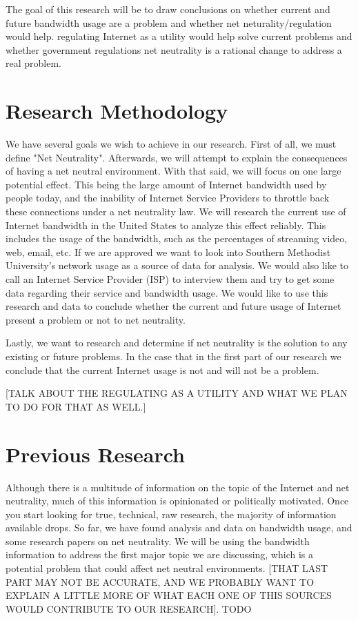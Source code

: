 \documentclass{sigcomm-alternate}
\begin{document}
The goal of this research will be to draw conclusions on whether current and future bandwidth usage are a problem and whether net neturality/regulation would help. regulating Internet as a utility would help solve current problems and whether government regulations net neutrality is a rational change to address a real problem.


     		
\section{Research Methodology}
We have several goals we wish to achieve in our research. First of all, we must define "Net Neutrality". Afterwards, we will attempt to explain the consequences of having a net neutral environment. With that said, we will focus on one large potential effect. This being the large amount of Internet bandwidth used by people today, and the inability of Internet Service Providers to throttle back these connections under a net neutrality law. We will research the current use of Internet bandwidth in the United States to analyze this effect reliably. This includes the usage of the bandwidth, such as the percentages of streaming video, web, email, etc. If we are approved we want to look into Southern Methodist University's network usage as a source of data for analysis. We would also like to call an Internet Service Provider (ISP) to interview them and try to get some data regarding their service and bandwidth usage. We would like to use this research and data to conclude whether the current and future usage of Internet present a problem or not to net neutrality.  

Lastly, we want to research and determine if net neutrality is the solution to any existing or future problems. In the case that in the first part of our research we conclude that the current Internet usage is not and will not be a problem.

[TALK ABOUT THE REGULATING AS A UTILITY AND WHAT WE PLAN TO DO FOR THAT AS WELL.]

\section{Previous Research}
Although there is a multitude of information on the topic of the Internet and net neutrality, much of this information is opinionated or politically motivated. Once you start looking for true, technical, raw research, the majority of information available drops. So far, we have found analysis and data on bandwidth usage, and some research papers on net neutrality. We will be using the bandwidth information to address the first major topic we are discussing, which is a potential problem that could affect net neutral environments. [THAT LAST PART MAY NOT BE ACCURATE, AND WE PROBABLY WANT TO EXPLAIN A LITTLE MORE OF WHAT EACH ONE OF THIS SOURCES WOULD CONTRIBUTE TO OUR RESEARCH].
TODO
\cite{Jain:2002:EAB:633025.633054}
\cite{Strauss:2003:MSA:948205.948211}
\end{document}
